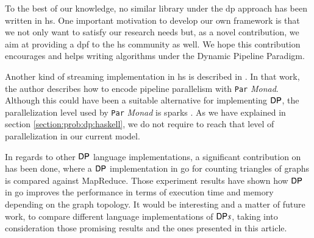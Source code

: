 To the best of our knowledge, no similar library under the  \acrshort{dp} approach has been written in \acrlong{hs}. 
One important motivation to develop our own framework is that  we not only  want to satisfy our research needs but, as a novel contribution, we aim at providing a \acrshort{dpf} to the \acrshort{hs} community as well. We hope this contribution encourages and helps writing algorithms under the Dynamic Pipeline Paradigm. 
\iffalse
Several implementations for streaming processing models \footnote{\url{https://hackage.haskell.org/package/conduit}}\footnote{\url{https://hackage.haskell.org/package/pipes}}\footnote{\url{https://hackage.haskell.org/package/streamly}} in \acrshort{hs} have arisen over the years. All these libraries have their abstractions and can do data streaming processing in a fast way with different performance according to recent benchmarks\footnote{\url{https://github.com/composewell/streaming-benchmarks}}. Although they seem to be suitable for implementing a $\DP$, it is required to know pipeline stages disposition beforehand, and it is hard to achieve a succinct and expressive implementation of a \acrshort{dpf}. Moreover, since they have been conceived as a data parallel streaming model \cite{hr19} by design instead of pipeline parallel streaming, implementing $\DP$ using these tools becomes counter-intuitive and hard to achieve.
\fi
Another kind of streaming implementation in \acrshort{hs} is described in \cite{parallelbook}. In that work, the author describes how to encode pipeline parallelism with \texttt{Par} \textit{Monad}. Although this could have been a suitable alternative for implementing $\DP$, the parallelization level used by \texttt{Par} \textit{Monad} is sparks \cite{sparks}. As we have explained in section \autoref{section:prob:dp:haskell}, we do not require to reach that level of parallelization in our current model.

In regards to other $\DP$ language implementations, a significant contribution on \cite{dpp_triangles} has been done, where a $\DP$ implementation in \acrfull{go} for counting triangles of graphs is compared against MapReduce. Those experiment results have shown how $\DP$ in \acrshort{go} improves the performance in terms of execution time and memory depending on the graph topology. It would be interesting and a matter of future work, to compare different language implementations of $\mathsf{DP} s$, taking into consideration those promising results and the ones presented in this article.

\iffalse
In particular, the problem presented in \autoref{sub:sec:mot:ex} is one of the algorithms in which the amount of stages that could run in parallel is the worst case having one Stage per edge at most, but still in that scenario the number of threads can be efficiently handled by \acrshort{ghc}. Therefore, there is no need for such a fine grained parallelization level as it could be required when the data should be split into the smallest processing units as possible. 
\fi
